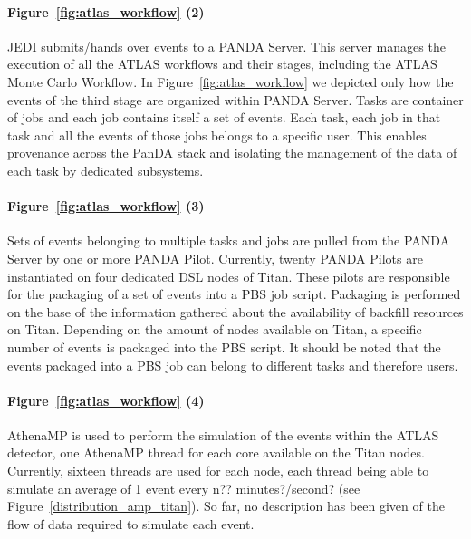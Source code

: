 \paragraph{Figure~\ref{fig:atlas_workflow} (2)} JEDI submits/hands over events
to a PANDA Server. This server manages the execution of all the ATLAS workflows
and their stages, including the ATLAS Monte Carlo Workflow. In
Figure~\ref{fig:atlas_workflow} we depicted only how the events of the third
stage are organized within PANDA Server. Tasks are container of jobs and each
job contains itself a set of events. Each task, each job in that task and all
the events of those jobs belongs to a specific user. This enables provenance
across the PanDA stack and isolating the management of the data of each task by
dedicated subsystems.

\paragraph{Figure~\ref{fig:atlas_workflow} (3)} Sets of events belonging to
multiple tasks and jobs are pulled from the PANDA Server by one or more PANDA
Pilot. Currently, twenty PANDA Pilots are instantiated on four dedicated DSL
nodes of Titan. These pilots are responsible for the packaging of a set of
events into a PBS job script. Packaging is performed on the base of the
information gathered about the availability of backfill resources on Titan.
Depending on the amount of nodes available on Titan, a specific number of events
is packaged into the PBS script. It should be noted that the events packaged
into a PBS job can belong to different tasks and therefore users.

\paragraph{Figure~\ref{fig:atlas_workflow} (4)} AthenaMP is used to perform the
simulation of the events within the ATLAS detector, one AthenaMP thread for each
core available on the Titan nodes. Currently, sixteen threads are used for each
node, each thread being able to simulate an average of 1 event every n??
minutes?/second? (see Figure~\ref{distribution_amp_titan}). So far, no
description has been given of the flow of data required to simulate each event.

